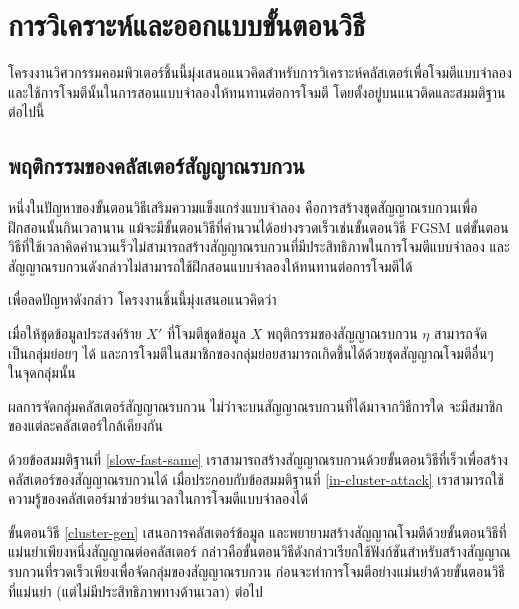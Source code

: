 \section{การวิเคราะห์และออกแบบขั้นตอนวิธี}

โครงงานวิศวกรรมคอมพิวเตอร์ชิ้นนี้มุ่งเสนอแนวคิดสำหรับการวิเคราะห์คลัสเตอร์เพื่อโจมตีแบบจำลองและใช้การโจมตีนั้นในการสอนแบบจำลองให้ทนทานต่อการโจมตี โดยตั้งอยู่บนแนวติดและสมมติฐานต่อไปนี้

\subsection{พฤติกรรมของคลัสเตอร์สัญญาณรบกวน}

หนึ่งในปัญหาของขั้นตอนวิธีเสริมความแข็งแกร่งแบบจำลอง คือการสร้างชุดสัญญาณรบกวนเพื่อฝึกสอนนั้นกินเวลานาน แม้จะมีขั้นตอนวิธีที่คำนวนได้อย่างรวดเร็วเช่นขั้นตอนวิธี FGSM แต่ขั้นตอนวิธีที่ใช้เวลาคิดคำนวนเร็วไม่สามารถสร้างสัญญาณรบกวนที่มีประสิทธิภาพในการโจมตีแบบจำลอง และสัญญาณรบกวนดังกล่าวไม่สามารถใช้ฝึกสอนแบบจำลองให้ทนทานต่อการโจมตีได้ \cite{aleks2017deep}

เพื่อลดปัญหาดังกล่าว โครงงานชิ้นนี้มุ่งเสนอแนวคิดว่า

\begin{claim}
    \label{in-cluster-attack}
    เมื่อให้ชุดข้อมูลประสงค์ร้าย $X'$ ที่โจมตีชุดข้อมูล $X$ พฤติกรรมของสัญญาณรบกวน $\eta$ สามารถจัดเป็นกลุ่มย่อยๆ ได้ และการโจมตีในสมาชิกของกลุ่มย่อยสามารถเกิดขึ้นได้ด้วยชุดสัญญาณโจมตีอื่นๆ ในจุดกลุ่มนั้น
\end{claim}

\begin{claim}
    \label{slow-fast-same}
    ผลการจัดกลุ่มคลัสเตอร์สัญญาณรบกวน ไม่ว่าจะบนสัญญาณรบกวนที่ได้มาจากวิธีการใด จะมีสมาชิกของแต่ละคลัสเตอร์ใกล้เคียงกัน
\end{claim}

ด้วยข้อสมมติฐานที่ \ref{slow-fast-same} เราสามารถสร้างสัญญาณรบกวนด้วยขั้นตอนวิธีที่เร็วเพื่อสร้างคลัสเตอร์ของสัญญาณรบกวนได้ เมื่อประกอบกับข้อสมมติฐานที่ \ref{in-cluster-attack} เราสามารถใช้ความรู้ของคลัสเตอร์มาช่วยร่นเวลาในการโจมตีแบบจำลองได้

ขั้นตอนวิธี \ref{cluster-gen} เสนอการคลัสเตอร์ข้อมูล และพยายามสร้างสัญญาณโจมตีด้วยขั้นตอนวิธีที่แม่นยำเพียงหนึ่งสัญญาณต่อคลัสเตอร์  กล่าวคือขั้นตอนวิธีดังกล่าวเรียกใช้ฟังก์ชันสำหรับสร้างสัญญาณรบกวนที่รวดเร็วเพียงเพื่อจัดกลุ่มของสัญญาณรบกวน ก่อนจะทำการโจมตีอย่างแม่นยำด้วยขั้นตอนวิธีที่แม่นยำ (แต่ไม่มีประสิทธิภาพทางด้านเวลา) ต่อไป


